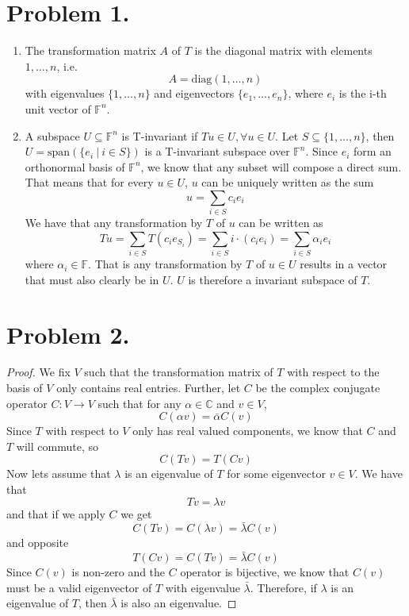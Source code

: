 \documentclass[a4paper,11pt,norsk]{article}
\begin{document}


\section*{Problem 1.}
\begin{enumerate}
    \item The transformation matrix $A$ of $T$ is the diagonal matrix with elements $1, \dots, n$, i.e.
        \[
            A = \text{diag}(1, \dots, n)
        \]
        with eigenvalues $\{1, \dots, n\}$ and eigenvectors $\{e_1, \dots, e_n\}$, where 
        $e_i$ is the i-th unit vector of $\mathbb{F}^n$.
    \item A subspace $U \subseteq \mathbb{F}^n$ is T-invariant if $Tu \in U, \forall u \in U$.
        Let $S \subseteq \{1, \dots, n\}$, then $U = \text{span}(\{e_i \:|\: i \in S\})$ is a T-invariant subspace over $\mathbb{F}^n$.
        Since $e_i$ form an orthonormal basis of $\mathbb{F}^n$, we know that any subset will compose a direct sum. 
        That means that for every $u \in U$, $u$ can be uniquely written as the sum
        \[
            u = \sum_{i \in S} c_i e_i
        \]
        We have that any transformation by $T$ of $u$ can be written as
        \[
            Tu = \sum_{i \in S} T (c_i e_{S_i}) = \sum_{i \in S} i \cdot (c_i e_i) = \sum_{i \in S} \alpha_i e_i
        \]
        where $\alpha_i \in \mathbb{F}$. That is any transformation by $T$ of $u \in U$ results in a vector
        that must also clearly be in $U$. $U$ is therefore a invariant subspace of $T$.
\end{enumerate}

\section*{Problem 2.}
\begin{proof}
We fix $V$ such that the transformation matrix of $T$ with respect to the basis of $V$ only contains real entries. Further, let
$C$ be the complex conjugate operator $C : V \to V$ such that for any $\alpha \in \mathbb{C}$ and $v \in V$,
\[
    C(\alpha v) = \bar{\alpha}C(v)
\]
Since $T$ with respect to $V$ only has real valued components, we know that $C$ and $T$ will commute, so
\[
    C(Tv) = T(Cv)
\]
Now lets assume that $\lambda$ is an eigenvalue of $T$ for some eigenvector $v \in V$. We have that
\[
    Tv = \lambda v
\]
and that if we apply $C$ we get
\[
    C(Tv) = C(\lambda v) = \bar{\lambda} C(v)
\]
and opposite
\[
    T(Cv) = C(Tv) = \bar{\lambda} C(v)
\]
Since $C(v)$ is non-zero and the $C$ operator is bijective, we know that $C(v)$ must be a valid eigenvector of $T$ with eigenvalue
$\bar{\lambda}$. Therefore, if $\lambda$ is an eigenvalue of $T$, then $\bar{\lambda}$ is also an eigenvalue.
\end{proof}
\end{document}
